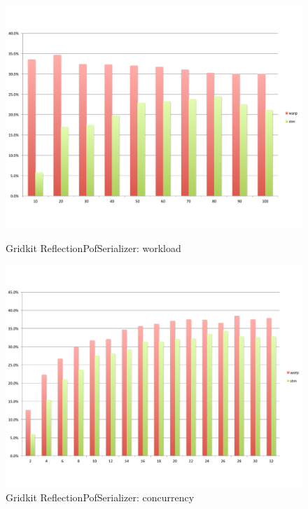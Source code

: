 \begin{figure}
\begin{minipage}{0.45 \textwidth}
		\includegraphics[width=\textwidth]{../../eval/32threads/case4it.pdf}
		\caption{\label{Fi:case4it}Gridkit {\sf ReflectionPofSerializer}: workload}
	\end{minipage}
	\hspace{0.1 \textwidth}
	\begin{minipage}{0.45 \textwidth}
		\includegraphics[width=\textwidth]{../../eval/32threads/case4th.pdf}
		\caption{\label{Fi:case4th}Gridkit {\sf ReflectionPofSerializer}: concurrency}
	\end{minipage}
\end{figure}

